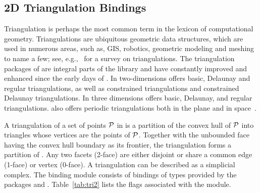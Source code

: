 \subsection{2D Triangulation Bindings}
\label{ssec:modules:tri2}
Triangulation is perhaps the most common term in the lexicon of
computational geometry. Triangulations are ubiquitous geometric data
structures, which are used in numerous areas, such as, GIS, robotics,
geometric modeling and meshing to name a few; see, e.g.,~\cite{by-ag-98}
for a survey on triangulations. The triangulation packages of \cgal{} are
integral parts of the library and have constantly improved and enhanced
since the early days of \cgal{}. In two-dimensions \cgal{} offers basic,
Delaunay and regular triangulations, as well as constrained triangulations
and constrained Delaunay triangulations. In three dimensions \cgal{} offers
basic, Delaunay, and regular triangulations. \cgal{} also offers periodic
triangulations both in the plane and in space~\cite{ct-cpt-09}.

A triangulation of a set of points ${\cal P}$ in \Rtwo is a partition of
the convex hull of ${\cal P}$ into triangles whose vertices are the
points of ${\cal P}$. Together with the unbounded face having the convex
hull boundary as its frontier, the triangulation forms a partition of
\Rtwo. Any two facets (2-face) are either disjoint or share a common
edge (1-face) or vertex (0-face). A triangulation can be described as
a simplicial complex. The binding module
\iiDTriangulationsPackage{} consists of bindings of types provided by
the \cgal{} packages \iiDTriangulationsPackage{} and
\iiDPeriodicTriangulationsPackage{}. Table~\ref{tab:tri2} lists the
\cmake{} flags associated with the \iiDTriangulationsPackage{}
module.


